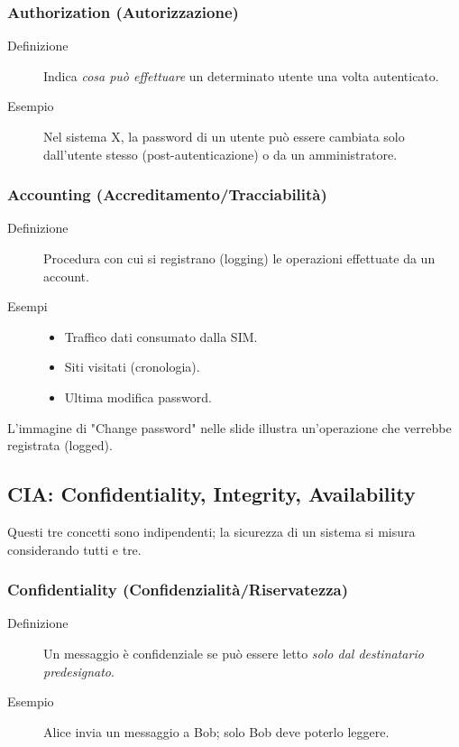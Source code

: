 \subsubsection{Authorization (Autorizzazione)}
\begin{description}
    \item[Definizione] Indica \textit{cosa può effettuare} un determinato utente una volta autenticato.
    \item[Esempio] Nel sistema X, la password di un utente può essere cambiata solo dall'utente stesso (post-autenticazione) o da un amministratore.
\end{description}

\subsubsection{Accounting (Accreditamento/Tracciabilità)}
\begin{description}
    \item[Definizione] Procedura con cui si registrano (logging) le operazioni effettuate da un account.
    \item[Esempi]
    \begin{itemize}
        \item Traffico dati consumato dalla SIM.
        \item Siti visitati (cronologia).
        \item Ultima modifica password.
    \end{itemize}
\end{description}
L'immagine di "Change password" nelle slide illustra un'operazione che verrebbe registrata (logged).

\subsection{CIA: Confidentiality, Integrity, Availability}
Questi tre concetti sono indipendenti; la sicurezza di un sistema si misura considerando tutti e tre.

\subsubsection{Confidentiality (Confidenzialità/Riservatezza)}
\begin{description}
    \item[Definizione] Un messaggio è confidenziale se può essere letto \textit{solo dal destinatario predesignato}.
    \item[Esempio] Alice invia un messaggio a Bob; solo Bob deve poterlo leggere.
\end{description}

